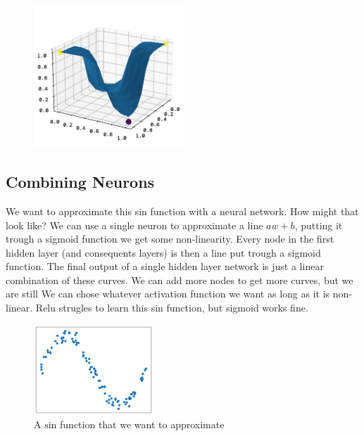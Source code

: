 \documentclass[twoside,11pt]{report}
\begin{document}
    \begin{figure}[!h]
        \begin{center}
            \includegraphics[width=0.5\textwidth]{../runsAndFigures/xor_nn.png}
        \end{center}
        \caption{}\label{fig:xor_nn}
    \end{figure}



\subsection*{Combining Neurons}
\label{app:neuronscombined}

    We want to approximate this sin function with a neural network. How might that look like?
    We can use a single neuron to approximate a line $a w + b$, putting it trough a sigmoid function
    we get some non-linearity. Every node in the first hidden layer (and consequents layers) is then 
    a line put trough a sigmoid function. The final output of a single hidden layer network is just
    a linear combination of these curves. We can add more nodes to get more curves, but we are still
    We can chose whatever activation function we want as long as it is non-linear. Relu strugles to learn this 
    sin function, but sigmoid works fine.


    \begin{figure}
        \begin{center}
            \includegraphics[width=0.4\textwidth]{../runsAndFigures/sin.png}
        \end{center}
        \caption{A $\text{sin}$ function that we want to approximate}\label{fig:sin}
    \end{figure}
\end{document}
